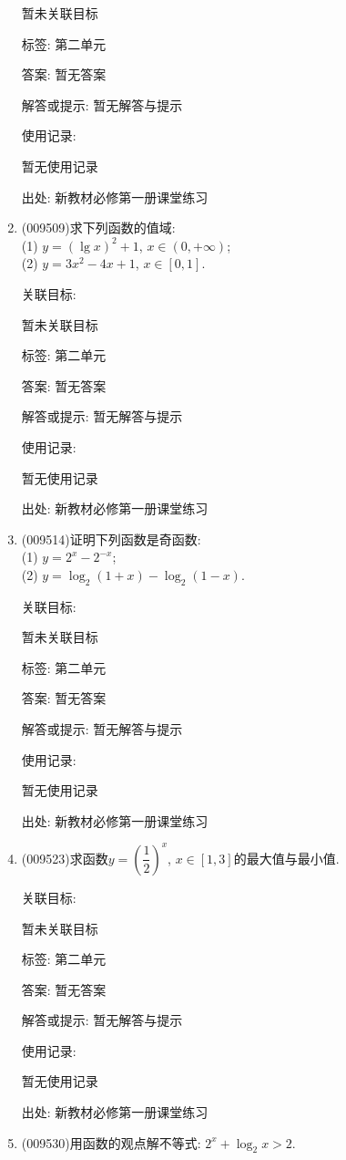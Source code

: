 \documentclass[10pt,a4paper]{article}
\begin{document}
\begin{enumerate}[1.]
暂未关联目标



标签: 第二单元

答案: 暂无答案

解答或提示: 暂无解答与提示

使用记录:

暂无使用记录


出处: 新教材必修第一册课堂练习
\item { (009509)}求下列函数的值域:\\
(1) $y=(\lg x)^2+1$, $x\in (0, +\infty)$;\\
(2) $y=3x^2-4x+1$, $x\in [0, 1]$.


关联目标:

暂未关联目标



标签: 第二单元

答案: 暂无答案

解答或提示: 暂无解答与提示

使用记录:

暂无使用记录


出处: 新教材必修第一册课堂练习
\item { (009514)}证明下列函数是奇函数:\\
(1) $y=2^x-2^{-x}$;\\
(2) $y=\log_2(1+x)-\log_2(1-x)$.


关联目标:

暂未关联目标



标签: 第二单元

答案: 暂无答案

解答或提示: 暂无解答与提示

使用记录:

暂无使用记录


出处: 新教材必修第一册课堂练习
\item { (009523)}求函数$y=(\dfrac 12)^x$, $x\in [1, 3]$的最大值与最小值.


关联目标:

暂未关联目标



标签: 第二单元

答案: 暂无答案

解答或提示: 暂无解答与提示

使用记录:

暂无使用记录


出处: 新教材必修第一册课堂练习
\item { (009530)}用函数的观点解不等式: $2^x+\log_2x>2$.



\end{enumerate}
\end{document}
